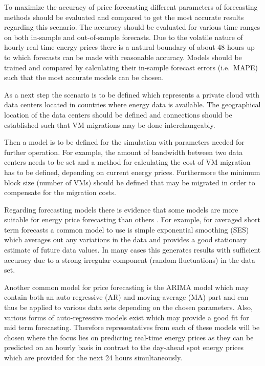 \documentclass[a4paper]{article}
\begin{document}
To maximize the accuracy of price forecasting different parameters of forecasting methods should be evaluated and compared to get the most accurate results regarding this scenario. The accuracy should be evaluated for various time ranges on both in-sample and out-of-sample forecasts. Due to the volatile nature of hourly real time energy prices there is a natural boundary of about 48 hours up to which forecasts can be made with reasonable accuracy. Models should be trained and compared by calculating their in-sample forecast errors (i.e.~MAPE) such that the most accurate models can be chosen. 

As a next step the scenario is to be defined which represents a private cloud with data centers located in countries where energy data is available. The geographical location of the data centers should be defined and connections should be established such that VM migrations may be done interchangeably. 

Then a model is to be defined for the simulation with parameters needed for further operation. For example, the amount of bandwidth between two data centers needs to be set and a method for calculating the cost of VM migration has to be defined, depending on current energy prices. Furthermore the minimum block size (number of VMs) should be defined that may be migrated in order to compensate for the migration costs. 

Regarding forecasting models there is evidence that some models are more suitable for energy price forecasting than others \cite{weron2008forecasting}\cite{weron2005forecasting}. For example, for averaged short term forecasts a common model to use is simple exponential smoothing (SES) which averages out any variations in the data and provides a good stationary estimate of future data values. In many cases this generates results with sufficient accuracy due to a strong irregular component (random fluctuations) in the data set. 

Another common model for price forecasting is the ARIMA model which may contain both an auto-regressive (AR) and moving-average (MA) part and can thus be applied to various data sets depending on the chosen parameters. Also, various forms of auto-regressive models exist which may provide a good fit for mid term forecasting. 
Therefore representatives from each of these models will be chosen where the focus lies on predicting real-time energy prices as they can be predicted on an hourly basis in contrast to the day-ahead spot energy prices which are provided for the next 24 hours simultaneously. 
\end{document}
